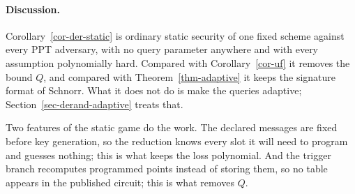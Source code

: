 \paragraph*{Discussion.} Corollary~\ref{cor-der-static} is ordinary static security of one fixed scheme against every PPT adversary, with no query parameter anywhere and with every assumption polynomially hard. Compared with Corollary~\ref{cor-uf} it removes the bound $Q$, and compared with Theorem~\ref{thm-adaptive} it keeps the signature format of Schnorr. What it does not do is make the queries adaptive; Section~\ref{sec-derand-adaptive} treats that.

Two features of the static game do the work. The declared messages are fixed before key generation, so the reduction knows every slot it will need to program and guesses nothing; this is what keeps the loss polynomial. And the trigger branch recomputes programmed points instead of storing them, so no table appears in the published circuit; this is what removes $Q$.

